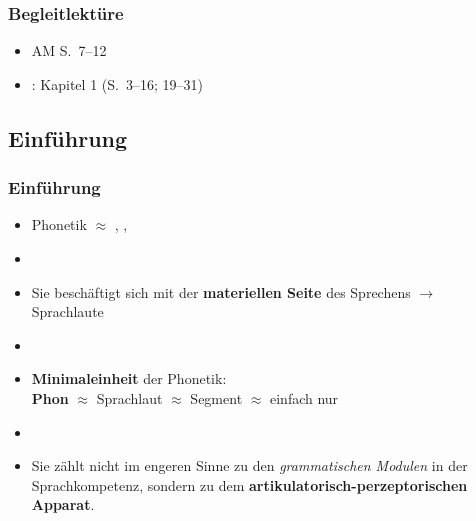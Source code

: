 \begin{frame}
\frametitle{Begleitlektüre}

\begin{itemize}
	\item AM S.~7--12
	\item \citet{Hall00a}: Kapitel 1 (S.~3--16; 19--31) 
\end{itemize}
\end{frame}


\subsection{Einführung}


\begin{frame}
\frametitle{Einführung}

	\begin{itemize}
		\item Phonetik $\approx$ , , 
		\item[]
		\item Sie beschäftigt sich mit der \textbf{materiellen Seite} des Sprechens $\rightarrow$ Sprachlaute 
		\item[]
		\item \textbf{Minimaleinheit} der Phonetik:\\
                      \textbf{Phon} $\approx$ Sprachlaut $\approx$ Segment $\approx$ einfach nur 
		\item[]
		\item Sie zählt nicht im engeren Sinne zu den \textit{grammatischen Modulen} in der Sprachkompetenz, sondern zu dem \textbf{artikulatorisch-perzeptorischen Apparat}.
	\end{itemize}
	
\end{frame}



